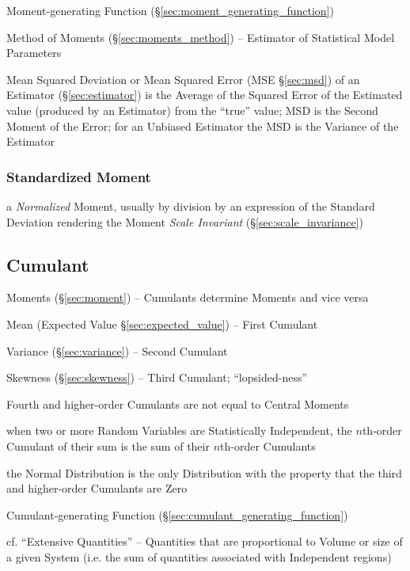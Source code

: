 \fist Moment-generating Function (\S\ref{sec:moment_generating_function})

\fist Method of Moments (\S\ref{sec:moments_method}) -- Estimator of Statistical
Model Parameters

\fist Mean Squared Deviation or Mean Squared Error (MSE \S\ref{sec:msd}) of an
Estimator (\S\ref{sec:estimator}) is the Average of the Squared Error of the
Estimated value (produced by an Estimator) from the ``true'' value; MSD is
the Second Moment of the Error; for an Unbiased Estimator the MSD is the
Variance of the Estimator



\subsubsection{Standardized Moment}\label{sec:standardized_moment}

a \emph{Normalized} Moment, usually by division by an expression of the Standard
Deviation rendering the Moment \emph{Scale Invariant}
(\S\ref{sec:scale_invariance})



\subsection{Cumulant}\label{sec:cumulant}

\fist Moments (\S\ref{sec:moment}) -- Cumulants determine Moments and vice
versa

Mean (Expected Value \S\ref{sec:expected_value}) -- First Cumulant

Variance (\S\ref{sec:variance}) -- Second Cumulant

Skewness (\S\ref{sec:skewness}) -- Third Cumulant; ``lopsided-ness''

Fourth and higher-order Cumulants are not equal to Central Moments

when two or more Random Variables are Statistically Independent, the $n$th-order
Cumulant of their sum is the sum of their $n$th-order Cumulants

the Normal Distribution is the only Distribution with the property that the
third and higher-order Cumulants are Zero

\fist Cumulant-generating Function (\S\ref{sec:cumulant_generating_function})

cf. ``Extensive Quantities'' -- Quantities that are proportional to Volume or
size of a given System (i.e. the sum of quantities associated with Independent
regions)



